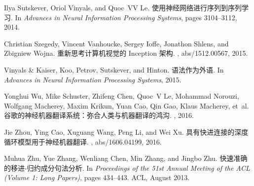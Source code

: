 \documentclass{article}
\begin{document}
\begin{thebibliography}{10}
Ilya Sutskever, Oriol Vinyals, and Quoc~VV Le.
\newblock 使用神经网络进行序列到序列学习.
\newblock In {\em Advances in Neural Information Processing Systems}, pages
  3104--3112, 2014.

Christian Szegedy, Vincent Vanhoucke, Sergey Ioffe, Jonathon Shlens, and
  Zbigniew Wojna.
\newblock 重新思考计算机视觉的 Inception 架构.
, abs/1512.00567, 2015.

{Vinyals {\&} Kaiser}, Koo, Petrov, Sutskever, and Hinton.
\newblock 语法作为外语.
\newblock In {\em Advances in Neural Information Processing Systems}, 2015.

Yonghui Wu, Mike Schuster, Zhifeng Chen, Quoc~V Le, Mohammad Norouzi, Wolfgang
  Macherey, Maxim Krikun, Yuan Cao, Qin Gao, Klaus Macherey, et~al.
\newblock 谷歌的神经机器翻译系统：弥合人类与机器翻译的鸿沟.
, 2016.

Jie Zhou, Ying Cao, Xuguang Wang, Peng Li, and Wei Xu.
\newblock 具有快进连接的深度循环模型用于神经机器翻译.
, abs/1606.04199, 2016.

Muhua Zhu, Yue Zhang, Wenliang Chen, Min Zhang, and Jingbo Zhu.
\newblock 快速准确的移进-归约成分句法分析.
\newblock In {\em Proceedings of the 51st Annual Meeting of the ACL (Volume 1:
  Long Papers)}, pages 434--443. ACL, August 2013.

\end{thebibliography}

%

%
\end{document}
